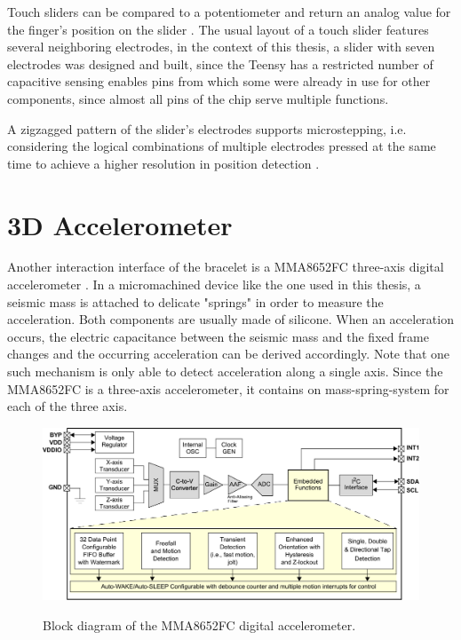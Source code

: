 Touch sliders can be compared to a potentiometer and return an analog value for the finger's position on the slider \cite{Camacho2010}. The usual layout of a touch slider features several neighboring electrodes, in the context of this thesis, a slider with seven electrodes was designed and built, since the Teensy has a restricted number of capacitive sensing enables pins from which some were already in use for other components, since almost all pins of the chip serve multiple functions.

A zigzagged pattern of the slider's electrodes supports microstepping, i.e. considering the logical combinations of multiple electrodes pressed at the same time to achieve a higher resolution in position detection \cite{Camacho2010}.

\section{3D Accelerometer}
\label{sec:accel}
Another interaction interface of the bracelet is a MMA8652FC three-axis digital accelerometer \cite{datasheet:mma8652}. In a micromachined device like the one used in this thesis, a seismic mass is attached to delicate "springs" in order to measure the acceleration. Both components are usually made of silicone. When an acceleration occurs, the electric capacitance between the seismic mass and the fixed frame changes and the occurring acceleration can be derived accordingly. Note that one such mechanism is only able to detect acceleration along a single axis. Since the MMA8652FC is a three-axis accelerometer, it contains on mass-spring-system for each of the three axis.

\begin{figure}[bth]
	\myfloatalign
	\includegraphics[width=\linewidth]{gfx/accel.pdf}
	\label{fig:accel}
	\caption{Block diagram of the MMA8652FC digital accelerometer. \cite{datasheet:mma8652}}
\end{figure}

